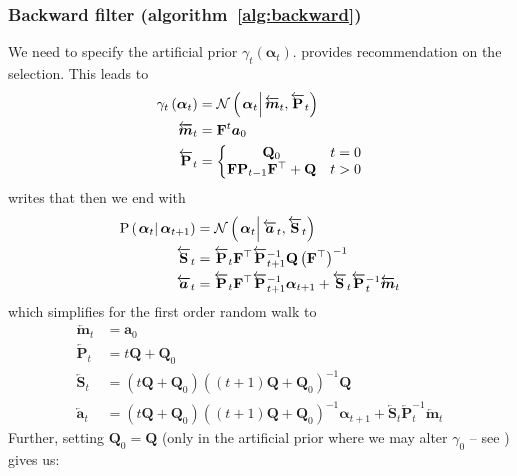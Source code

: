 \documentclass[9pt, notitlepage]{article}
\renewcommand{\vec}[1]{\bm{#1}}
\newcommand{\vecLarrow}[1]{\overleftarrow{\vec{#1}}}
\newcommand{\mat}[1]{\mathbf{#1}}
\newcommand{\matLarrow}[1]{\overleftarrow{\mat{#1}}}
\newcommand{\Lparen}[1]{\left( #1\right)}
\newcommand{\Cond}[2]{\left. #1 \vphantom{#2} \right\vert  #2}
\newcommand{\Prob}{\text{P}}
\newcommand{\optor}[2]{#1\Lparen{#2}}
\newcommand{\optorC}[3]{\optor{#1}{\Cond{#2}{#3}}}
\newcommand{\propC}[2]{\optorC{\Prob}{#1}{#2}}
\newcommand{\normalC}[3]{\optorC{\mathcal{N}}{#1}{#2,#3}}
\begin{document}
\subsubsection*{Backward filter (algorithm~\ref{alg:backward})}
We need to specify the artificial prior $\gamma_t\Lparen{\vec{\alpha}_t}$. \citet[page 69 and 70]{briers10} provides recommendation on the selection. This leads to%
%
\begin{equation}\begin{split}
	\gamma_t\Lparen{\vec{\alpha}_t} &=
		\normalC{\vec{\alpha}_t}{\vecLarrow{m}_t}{\matLarrow{P}_t} \\
%
	\vecLarrow{m}_t &= \mat{F}^t\vec{a}_0 \\
%
	\matLarrow{P}_t &= \left\{
		\begin{matrix} \mat{Q}_0 & t = 0 \\ \mat{F}\mat{P}_{t - 1}\mat{F}^\top + \mat{Q} & t > 0   \end{matrix} \right.
\end{split}\end{equation}
%
%
\cite{fearnhead10} writes that then we end with%
%
\begin{equation}\label{eqn:bwTransProp}\begin{split}
	\propC{\vec{\alpha}_t}{\vec{\alpha}_{t+1}} &=
	\normalC{\vec{\alpha}_t}{\vecLarrow{a}_t}{\matLarrow{S}_t} \\
%
	\matLarrow{S}_t &= \matLarrow{P}_t\mat{F}^\top\matLarrow{P}_{t + 1}^{-1}\mat{Q}\Lparen{\mat{F}^\top}^{-1} \\
%
	\vecLarrow{a}_t &=
		\matLarrow{P}_t\mat{F}^\top\matLarrow{P}_{t + 1}^{-1}\vec{\alpha}_{t+1}
		+ \matLarrow{S}_t\matLarrow{P}_t^{-1} \vecLarrow{m}_t
\end{split}\end{equation}%
%
which simplifies for the first order random walk to%
%
\begin{equation}\begin{split}
	\vecLarrow{m}_t &= \vec{a}_0 \\
%
	\matLarrow{P}_t &= t\mat{Q} + \mat{Q}_0 \\
%
	\matLarrow{S}_t &=
		\Lparen{t\mat{Q} + \mat{Q}_0}
		\Lparen{(t+1)\mat{Q} + \mat{Q}_0}^{-1}\mat{Q} \\
%
	\vecLarrow{a}_t &=
		\Lparen{t\mat{Q} + \mat{Q}_0}
		\Lparen{(t+1)\mat{Q} + \mat{Q}_0}^{-1}\vec{\alpha}_{t+1}
		+ \matLarrow{S}_t\matLarrow{P}_t^{-1} \vecLarrow{m}_t
\end{split}\end{equation}%
%
Further, setting $\mat{Q}_0 = \mat{Q}$ (only in the artificial prior where we may alter $\gamma_0$ -- see \citet[page 70]{briers10}) gives us:
\end{document}

